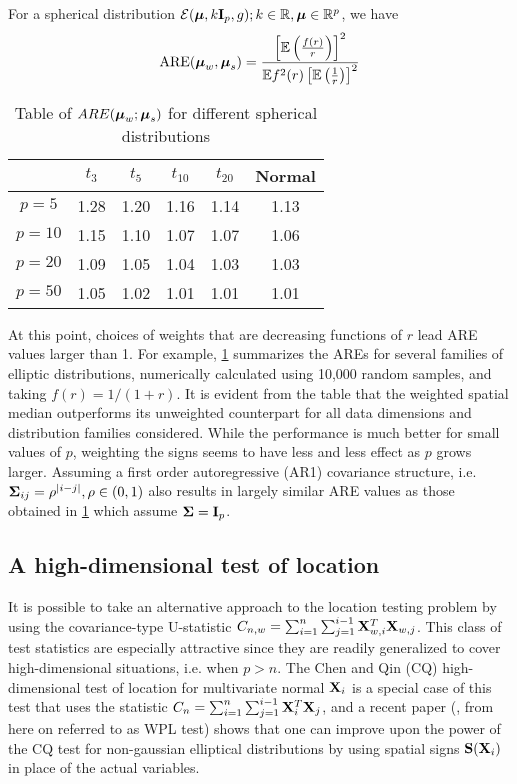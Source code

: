 \begin{Corollary}\label{Corollary:wsmCorollary}
For a spherical distribution $\mathcal{E}({\boldsymbol{\mu}}, k{\mathbf{I}}_p, g); k \in {\mathbb{R}}, {\boldsymbol{\mu}} \in {\mathbb{R}}^p$, we have
%
$$
\text{ARE} ( {\boldsymbol{\mu}}_w, {\boldsymbol{\mu}}_s) = \frac{ \left[ {\mathbb{E}} \left( \frac{f(r)}{r} \right) \right]^2}{{\mathbb{E}} f^2(r) \left[ {\mathbb{E}} \left( \frac{1}{r} \right) \right]^2 }
$$
%
\end{Corollary}
%
\begin{table}[t]
\begin{footnotesize}
	\centering
    \begin{tabular}{c|ccccc}
    \hline
    & $t_3$   & $t_5$   & $t_{10}$  & $t_{20}$  & Normal \\ \hline
    $p=5$    & 1.28 & 1.20 & 1.16 & 1.14 & 1.13   \\
    $p=10$   & 1.15 & 1.10 & 1.07 & 1.07 & 1.06   \\
    $p=20$   & 1.09 & 1.05 & 1.04 & 1.03 & 1.03   \\
    $p=50$   & 1.05 & 1.02 & 1.01 & 1.01 & 1.01   \\ \hline
    \end{tabular}
    \caption{Table of $ARE({\boldsymbol{\mu}}_w; {\boldsymbol{\mu}}_s)$ for different spherical distributions}
    \label{table:AREtablewsm}
\end{footnotesize}
\end{table}
%
At this point, choices of weights that are decreasing functions of $r$ lead ARE values larger than 1. For example, \ref{table:AREtablewsm} summarizes the AREs for several families of elliptic distributions, numerically calculated using 10,000 random samples, and taking $f(r) = 1/(1+r)$. It is evident from the table that the weighted spatial median outperforms its unweighted counterpart for all data dimensions and distribution families considered. While the performance is much better for small values of $p$, weighting the signs seems to have less and less effect as $p$ grows larger. Assuming a first order autoregressive (AR1) covariance structure, i.e. ${\boldsymbol{\Sigma}}_{ij} = \rho^{|i-j|}, \rho \in (0,1)$ also results in largely similar ARE values as those obtained in \ref{table:AREtablewsm} which assume ${\boldsymbol{\Sigma}} = {\mathbf{I}}_p$.

\subsection{A high-dimensional test of location}

It is possible to take an alternative approach to the location testing problem by using the covariance-type U-statistic $C_{n,w} = \sum_{i=1}^n \sum_{j=1}^{i-1} {\mathbf{X}}_{w,i}^T {\mathbf{X}}_{w,j}$. This class of test statistics are especially attractive since they are readily generalized to cover high-dimensional situations, i.e. when $p > n$. The Chen and Qin (CQ) high-dimensional test of location for multivariate normal ${\mathbf{X}}_i$ \citep{ChenQin10} is a special case of this test that uses the statistic $C_n = \sum_{i=1}^n \sum_{j=1}^{i-1} {\mathbf{X}}_i^T {\mathbf{X}}_j$, and a recent paper (\cite{WangPengLi15}, from here on referred to as WPL test) shows that one can improve upon the power of the CQ test for non-gaussian elliptical distributions by using spatial signs ${\mathbf{S}}({\mathbf{X}}_i)$ in place of the actual variables.

